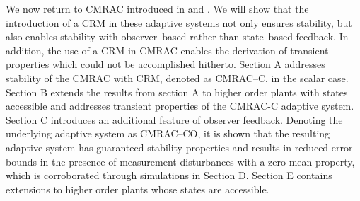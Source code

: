 \documentclass[10pt,journal]{IEEEtran}
\theoremstyle{plain}%
\theoremstyle{definition}
\begin{document}
We now return to CMRAC introduced in \cite{duarte1989combined} and \cite{slotine1989composite}. We will show that the introduction of a CRM in these adaptive systems not only ensures stability, but also enables stability with observer--based rather than state--based feedback. In addition, the use of a CRM in CMRAC enables the derivation of transient properties which could not be accomplished hitherto. Section A addresses stability of the CMRAC with CRM, denoted as CMRAC--C, in the scalar case. Section B extends the results from section A to higher order plants with states accessible and addresses transient properties of the CMRAC-C adaptive system. Section C introduces an additional feature of observer feedback. Denoting the underlying adaptive system as CMRAC--CO, it is shown that the resulting adaptive system has guaranteed stability properties and results in reduced error bounds in the presence of measurement disturbances with a zero mean property, which is corroborated through simulations in Section D. Section E contains extensions to higher order plants whose states are accessible.
\end{document}
